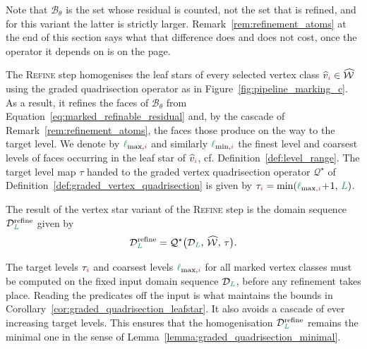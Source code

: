 \documentclass[a4paper, 12pt]{article}
\makeatletter
\newcommand{\quadriV}{\mathcal{Q}^{\star}}                       %
\newcommand{\quadriVup}[1]{\quadriV_{\rightarrow #1}}            %
\newcommand{\lminIdx}[1]{\l_{\min,#1}}
\newcommand{\lmaxIdx}[1]{\l_{\max,#1}}
\newcommand{\targetlevel}{\tau}                                 %
\newcommand{\green}{\color{ForestGreen}}
\newcommand{\brickred}{\color{BrickRed}}
\newcommand{\vertexClass}[1]{\widehat{v}_{#1}}
\DeclareRobustCommand{\markedVertexClasses}[1][]{\widehat{\mathcal{W}}\ifx\@empty#1\@empty\else^{#1}\fi}
\newcommand{\coarseIdxone}{{\brickred i}}
\renewcommand{\l}{{\green\ell}}
\renewcommand{\L}{{\green L}}
\newcommand{\B}{\mathcal{B}}
\theoremstyle{definition}
\theoremstyle{plain}
\numberwithin{equation}{section}
\newcommand{\tobecut}[1]{{\color{red} #1}}     %
\DeclareRobustCommand{\domseq}[1][]{\mathcal{D}\ifx\@empty#1\@empty\else_{#1}\fi}
\makeatother
\begin{document}
Note that $\B_\theta$ is the set whose residual is counted, not the set that is refined, and for this variant the latter is strictly larger. Remark~\ref{rem:refinement_atoms} at the end of this section says what that difference does and does not cost, once the operator it depends on is on the page.

\smallskip

The \textsc{Refine} step homogenises the leaf stars of every selected vertex class $\vertexClass{\coarseIdxone} \in \markedVertexClasses$ using the graded quadrisection operator as in Figure~\ref{fig:pipeline_marking_c}. As a result, it refines the faces of $\B_\theta$ from Equation~\eqref{eq:marked_refinable_residual} and, by the cascade of Remark~\ref{rem:refinement_atoms}, the faces those produce on the way to the target level. We denote by $\lmaxIdx{\coarseIdxone}$ and similarly $\lminIdx{\coarseIdxone}$ the finest level and coarsest levels of faces occurring in the leaf star of $\vertexClass{\coarseIdxone}$, cf. Definition~\ref{def:level_range}. The target level map $\targetlevel$ handed to the graded vertex quadrisection operator $\quadriV$ of Definition~\ref{def:graded_vertex_quadrisection} is given by $\targetlevel_\coarseIdxone = \min(\lmaxIdx{\coarseIdxone} \! + \! 1, \, \L)$.  

The result of the vertex star variant of the \textsc{Refine} step is the domain sequence $\domseq[\L]^{\mathrm{refine}}$ given by
\begin{equation}
    \domseq[\L]^{\mathrm{refine}} = \quadriV \big( \domseq[\L], \, \markedVertexClasses, \, \targetlevel \big).
\end{equation}

The target levels $\targetlevel_\coarseIdxone$ and coarsest levels $\lmaxIdx{\coarseIdxone}$ for all marked vertex classes must be computed on the fixed input domain sequence $\domseq[\L]$, before any refinement takes place. Reading the predicates off the input is what maintains the bounds in Corollary~\ref{cor:graded_quadrisection_leafstar}. It also avoids a cascade of ever increasing target levels. This ensures that the homogenisation $\domseq[\L]^{\mathrm{refine}}$ remains the minimal one in the sense of Lemma~\ref{lemma:graded_quadrisection_minimal}.
\end{document}
